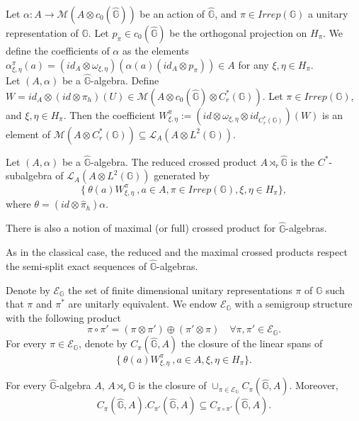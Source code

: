 Let $\alpha : A\rightarrow \mathcal M(A\otimes c_0(\hat{\mathbb G}))$ be an action of $\hat{\mathbb G}$, and $\pi\in Irrep(\mathbb G)$ a unitary representation of $\mathbb G$. Let $p_\pi\in c_0(\hat{\mathbb G}) $ be the orthogonal projection on $H_\pi$. We define the coefficients of $\alpha$ as the elements $\alpha^\pi_{\xi,\eta}(a) = ( id_A \otimes \omega_{\xi,\eta})(\alpha(a)( id _A\otimes p_\pi)) \in A$ for any $\xi,\eta\in H_\pi$.\\  

Let $(A,\alpha)$ be a $\hat{\mathbb G}$-algebra. Define $W= id_A \otimes (id\otimes\pi_h)(U) \in \mathcal M (A\otimes c_0(\hat{\mathbb G})\otimes C^*_r(\mathbb G))  $. Let $\pi\in Irrep(\mathbb G)$, and $\xi,\eta \in H_\pi$. Then the coefficient 
$W^\pi_{\xi,\eta}:=(id\otimes \omega_{\xi,\eta}\otimes id_{C^*_r(\mathbb G)})(W)$ is an element of $\mathcal M(A\otimes C_r^*(\mathbb G)) \subseteq \mathcal L_A(A\otimes L^2(\mathbb G))$. 

\begin{definition} Let $(A,\alpha)$ be a $\hat{\mathbb G}$-algebra. The reduced crossed product $A\rtimes_r \hat{\mathbb G}$ is the $C^*$-subalgebra of $\mathcal L_A(A\otimes L^2(\mathbb G))$ generated by 
\[\{\ \theta(a)W^\pi_{\xi,\eta}\ , a\in A , \pi\in Irrep(\mathbb G),\xi,\eta\in H_\pi\},\]
where $\theta = ( id \otimes  \hat\pi_h)\alpha$.  
\end{definition}

\begin{rk}
There is also a notion of maximal (or full) crossed product for $\hat{\mathbb G}$-algebras.
\end{rk}

\begin{rk}
As in the classical case, the reduced and the maximal crossed products respect the semi-split exact sequences of $\hat{\mathbb G}$-algebras.
\end{rk}

Denote by $\mathcal E_{\mathbb G}$ the set of finite dimensional unitary representations $\pi$ of $\mathbb G$ such that $\pi$ and $\pi^*$ are unitarly equivalent. We endow $\mathcal E_{\mathbb G}$ with a semigroup structure with the following product 
\[\pi\circ \pi' = (\pi\otimes\pi')\oplus (\pi'\otimes \pi)\quad \forall \pi,\pi'\in \mathcal E_{\mathbb G}.\]
For every $\pi\in \mathcal E_{\mathbb G}$, denote by $C_\pi(\hat{\mathbb G}, A)$ the closure of the linear spans of 
\[\{\ \theta(a) W_{\xi,\eta}^\pi \ ,a\in A, \xi,\eta\in H_\pi\}.\]

\begin{prop} \label{filtrationQG}
For every $\hat{\mathbb G}$-algebra $A$, $A\rtimes_r \hat{\mathbb G}$ is the closure of $\cup_{\pi\in \mathcal E_{\mathbb G}} C_\pi(\hat{\mathbb G}, A)$. Moreover,
\[C_\pi(\hat{\mathbb G}, A).C_{\pi'}(\hat{\mathbb G}, A) \subseteq C_{\pi \circ \pi'}(\hat{\mathbb G}, A).\]
\end{prop}

